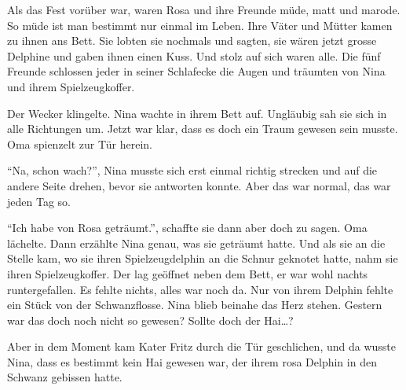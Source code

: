 Als das Fest vorüber war, waren Rosa und ihre Freunde müde, matt und marode. So müde ist man bestimmt nur einmal im Leben. Ihre Väter und Mütter kamen zu ihnen ans Bett. Sie lobten sie nochmals und sagten, sie wären jetzt grosse Delphine und gaben ihnen einen Kuss. Und stolz auf sich waren alle. Die fünf Freunde schlossen jeder in seiner Schlafecke die Augen und träumten von Nina und ihrem Spielzeugkoffer.

\vspace{10pt}
\centerline{\Huge \Dolphin[DeepPink]}
\vspace{10pt}

Der Wecker klingelte. Nina wachte in ihrem Bett auf. Ungläubig sah sie sich in alle Richtungen um. Jetzt war klar, dass es doch ein Traum gewesen sein musste. Oma spienzelt zur Tür herein.

\enquote{Na, schon wach?}, Nina musste sich erst einmal richtig strecken und auf die andere Seite drehen, bevor sie antworten konnte. Aber das war normal, das war jeden Tag so.

\enquote{Ich habe von Rosa geträumt.}, schaffte sie dann aber doch zu sagen. Oma lächelte. Dann erzählte Nina genau, was sie geträumt hatte. Und als sie an die Stelle kam, wo sie ihren Spielzeugdelphin an die Schnur geknotet hatte, nahm sie ihren Spielzeugkoffer. Der lag geöffnet neben dem Bett, er war wohl nachts runtergefallen. Es fehlte nichts, alles war noch da. Nur von ihrem Delphin fehlte ein Stück von der Schwanzflosse. Nina blieb beinahe das Herz stehen. Gestern war das doch noch nicht so gewesen? Sollte doch der Hai\dots?

Aber in dem Moment kam Kater Fritz durch die Tür geschlichen, und da wusste Nina, dass es bestimmt kein Hai gewesen war, der ihrem rosa Delphin in den Schwanz gebissen hatte.\hfill {\color{DeepPink}\decofourleft} 
